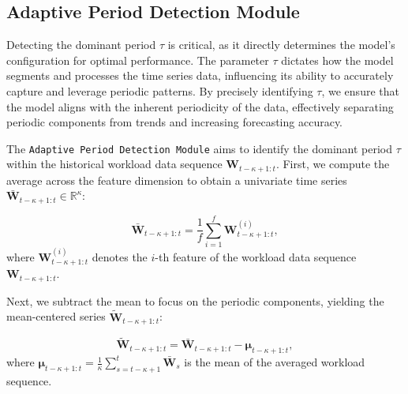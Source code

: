 \documentclass{ieeetmlcn}
\begin{document}
\subsection{Adaptive Period Detection Module}
\label{sec:adaptive_period_detection}

{\color{blue}
Detecting the dominant period $\tau$ is critical, as it directly determines the model's configuration for optimal performance. The parameter $\tau$ dictates how the model segments and processes the time series data, influencing its ability to accurately capture and leverage periodic patterns. By precisely identifying $\tau$, we ensure that the model aligns with the inherent periodicity of the data, effectively separating periodic components from trends and increasing forecasting accuracy.
}

The \texttt{Adaptive Period Detection Module} aims to identify the dominant period $\tau$ within the historical workload data sequence $\mathbf{W}_{t-\kappa+1:t}$. First, we compute the average across the feature dimension to obtain a univariate time series $\bar{\mathbf{W}}_{t-\kappa+1:t} \in \mathbb{R}^\kappa$:

\begin{equation}
\label{eq:feature_avg}
\bar{\mathbf{W}}_{t-\kappa+1:t} = \frac{1}{f} \sum_{i=1}^{f} \mathbf{W}_{t-\kappa+1:t}^{(i)},
\end{equation}
where $\mathbf{W}_{t-\kappa+1:t}^{(i)}$ denotes the $i$-th feature of the workload data sequence $\mathbf{W}_{t-\kappa+1:t}$.

Next, we subtract the mean to focus on the periodic components, yielding the mean-centered series $\tilde{\mathbf{W}}_{t-\kappa+1:t}$:

\begin{equation}
\label{eq:mean_removal}
\tilde{\mathbf{W}}_{t-\kappa+1:t} = \bar{\mathbf{W}}_{t-\kappa+1:t} - \boldsymbol{\mu}_{t-\kappa+1:t},
\end{equation}
where $\boldsymbol{\mu}_{t-\kappa+1:t} = \frac{1}{\kappa} \sum_{s=t-\kappa+1}^{t} \bar{\mathbf{W}}_s$ is the mean of the averaged workload sequence.
\end{document}
